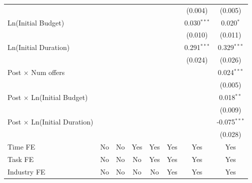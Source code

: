 \documentclass[
]{article}
\begin{document}
\begin{table}[htbp]
\begin{tabular}{lccccccc}
                                          &                &                &               &               &               & (0.004)       & (0.005)\\   
      Ln(Initial Budget)                  &                &                &               &               &               & 0.030$^{***}$ & 0.020$^{*}$\\   
                                          &                &                &               &               &               & (0.010)       & (0.011)\\   
      Ln(Initial Duration)                &                &                &               &               &               & 0.291$^{***}$ & 0.329$^{***}$\\   
                                          &                &                &               &               &               & (0.024)       & (0.026)\\   
      Post $\times$ Num offers            &                &                &               &               &               &               & 0.024$^{***}$\\   
                                          &                &                &               &               &               &               & (0.005)\\   
      Post $\times$ Ln(Initial Budget)    &                &                &               &               &               &               & 0.018$^{**}$\\   
                                          &                &                &               &               &               &               & (0.009)\\   
      Post $\times$ Ln(Initial Duration)  &                &                &               &               &               &               & -0.075$^{***}$\\   
                                          &                &                &               &               &               &               & (0.028)\\   
      Time FE                             & No             & No             & Yes           & Yes           & Yes           & Yes           & Yes\\  
      Task FE                             & No             & No             & No            & Yes           & Yes           & Yes           & Yes\\  
      Industry FE                         & No             & No             & No            & No            & Yes           & Yes           & Yes\\  

\end{tabular}
\end{table}
\end{document}

